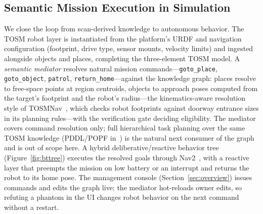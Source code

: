 \documentclass[electronics,article,accept,pdftex,moreauthors]{Definitions/mdpi}
\begin{document}
\subsection{Semantic Mission Execution in Simulation}
\label{sec:semnav}

We close the loop from scan-derived knowledge to autonomous behavior. The
TOSM robot layer is instantiated from the platform's URDF and navigation
configuration (footprint, drive type, sensor mounts, velocity limits) and
ingested alongside objects and places, completing the three-element TOSM
model. A \emph{semantic mediator} resolves natural mission commands---\texttt{goto\_place}, \texttt{goto\_object}, \texttt{patrol},
\texttt{return\_home}---against the knowledge graph: places resolve to
free-space points at region centroids, objects to approach poses computed
from the target's footprint and the robot's radius---the kinematics-aware
resolution style of TOSMNav~\cite{joo2022fsom}, which checks robot
footprints against doorway entrance sizes in its planning rules---with
the verification gate deciding eligibility. The mediator covers command
resolution only; full hierarchical task planning over the same TOSM
knowledge (PDDL/POPF in~\cite{joo2022fsom}) is the natural next consumer
of the graph and is out of scope here. A hybrid deliberative/reactive behavior
tree~\cite{colledanchise2018bt,iovino2022btsurvey}
(Figure~\ref{fig:bttree}) executes the resolved goals through
Nav2~\cite{macenski2020marathon}, with a
reactive layer that preempts the mission on low battery or an interrupt
and returns the robot to its home pose. The management console
(Section~\ref{sec:overview}) issues commands and edits the graph live; the
mediator hot-reloads owner edits, so refuting a phantom in the UI changes
robot behavior on the next command without a restart.
\end{document}

